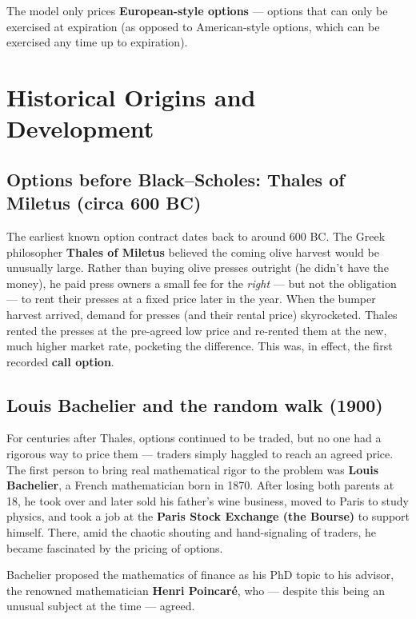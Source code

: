 \documentclass[12pt,openany]{book}
\theoremstyle{definition}
\theoremstyle{remark}
\begin{document}
The model only prices \textbf{European-style options} --- options that can only be exercised at expiration (as opposed to American-style options, which can be exercised any time up to expiration).

\section{Historical Origins and Development}

\subsection{Options before Black--Scholes: Thales of Miletus (circa 600 BC)}

The earliest known option contract dates back to around 600 BC. The Greek philosopher \textbf{Thales of Miletus} believed the coming olive harvest would be unusually large. Rather than buying olive presses outright (he didn't have the money), he paid press owners a small fee for the \emph{right} --- but not the obligation --- to rent their presses at a fixed price later in the year. When the bumper harvest arrived, demand for presses (and their rental price) skyrocketed. Thales rented the presses at the pre-agreed low price and re-rented them at the new, much higher market rate, pocketing the difference. This was, in effect, the first recorded \textbf{call option}.

\subsection{Louis Bachelier and the random walk (1900)}

For centuries after Thales, options continued to be traded, but no one had a rigorous way to price them --- traders simply haggled to reach an agreed price. The first person to bring real mathematical rigor to the problem was \textbf{Louis Bachelier}, a French mathematician born in 1870. After losing both parents at 18, he took over and later sold his father's wine business, moved to Paris to study physics, and took a job at the \textbf{Paris Stock Exchange (the Bourse)} to support himself. There, amid the chaotic shouting and hand-signaling of traders, he became fascinated by the pricing of options.

Bachelier proposed the mathematics of finance as his PhD topic to his advisor, the renowned mathematician \textbf{Henri Poincaré}, who --- despite this being an unusual subject at the time --- agreed.
\end{document}
